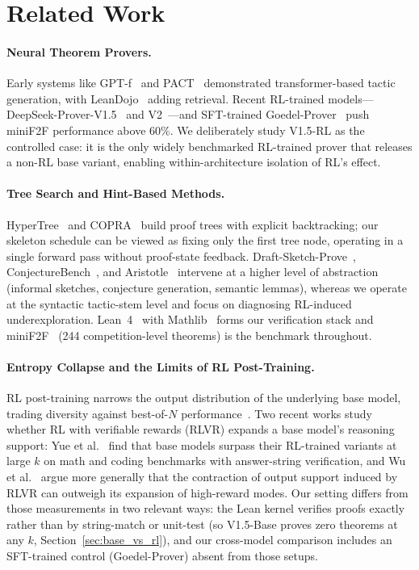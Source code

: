 \documentclass{article}
\begin{document}
\section{Related Work}
\label{sec:related}

\paragraph{Neural Theorem Provers.}
Early systems like GPT-f~\cite{polu2020generative} and PACT~\cite{han2022proof} demonstrated transformer-based tactic generation, with LeanDojo~\cite{yang2023leandojo} adding retrieval. Recent RL-trained models---DeepSeek-Prover-V1.5~\cite{xin2024deepseek} and V2~\cite{deepseekv2prover}---and SFT-trained Goedel-Prover~\cite{lin2025goedel} push miniF2F performance above 60\%. We deliberately study V1.5-RL as the controlled case: it is the only widely benchmarked RL-trained prover that releases a non-RL base variant, enabling within-architecture isolation of RL's effect.

\paragraph{Tree Search and Hint-Based Methods.}
HyperTree~\cite{lample2022hypertree} and COPRA~\cite{thakur2023copra} build proof trees with explicit backtracking; our skeleton schedule can be viewed as fixing only the first tree node, operating in a single forward pass without proof-state feedback. Draft-Sketch-Prove~\cite{jiang2023dsp}, ConjectureBench~\cite{sivakumar2025conjecturing}, and Aristotle~\cite{achim2025aristotle} intervene at a higher level of abstraction (informal sketches, conjecture generation, semantic lemmas), whereas we operate at the syntactic tactic-stem level and focus on diagnosing RL-induced underexploration. Lean~4~\cite{demoura2021lean4} with Mathlib~\cite{mathlib} forms our verification stack and miniF2F~\cite{zheng2022minif2f} (244 competition-level theorems) is the benchmark throughout.

\paragraph{Entropy Collapse and the Limits of RL Post-Training.}
RL post-training narrows the output distribution of the underlying base model, trading diversity against best-of-$N$ performance~\cite{kirk2024understanding}. Two recent works study whether RL with verifiable rewards (RLVR) expands a base model's reasoning support: Yue et al.~\cite{yue2025rlvr} find that base models surpass their RL-trained variants at large $k$ on math and coding benchmarks with answer-string verification, and Wu et al.~\cite{wu2025invisibleleash} argue more generally that the contraction of output support induced by RLVR can outweigh its expansion of high-reward modes. Our setting differs from those measurements in two relevant ways: the Lean kernel verifies proofs exactly rather than by string-match or unit-test (so V1.5-Base proves zero theorems at any $k$, Section~\ref{sec:base_vs_rl}), and our cross-model comparison includes an SFT-trained control (Goedel-Prover) absent from those setups.
\end{document}
